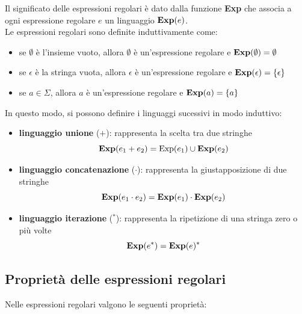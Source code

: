 \documentclass[12pt, a4paper, oneside]{book}
\begin{document}
  Il significato delle espressioni regolari è dato dalla funzione \textbf{Exp} che associa a ogni espressione regolare $e$ un linguaggio $\text{\textbf{Exp}}(e)$. \\[0.2ex]
  Le espressioni regolari sono definite induttivamente come:
  \begin{itemize}
    \item se $\emptyset$ è l'insieme vuoto, allora $\emptyset$ è un'espressione regolare e $\text{\textbf{Exp}}(\emptyset) = \emptyset$
    \item se $\epsilon$ è la stringa vuota, allora $\epsilon$ è un'espressione regolare e $\text{\textbf{Exp}}(\epsilon) = \{\epsilon\}$
    \item se $a \in \Sigma$, allora $a$ è un'espressione regolare e $\text{\textbf{Exp}}(a) = \{a\}$
  \end{itemize}


  In questo modo, si possono definire i linguaggi sucessivi in modo induttivo:
  \begin{itemize}
    \item \textcolor{azzurrino}{\textbf{linguaggio unione}} ($+$): rappresenta la scelta tra due stringhe
    \begin{equation*}
      \text{\textbf{Exp}}(e_1+e_2) = \text{Exp}(e_1) \cup \textbf{Exp}(e_2)
    \end{equation*}
    \item \textcolor{azzurrino}{\textbf{linguaggio concatenazione}} ($\cdot$): rappresenta la giustapposizione di due stringhe
    \begin{equation*}
      \text{\textbf{Exp}}(e_1 \cdot e_2) = \text{\textbf{Exp}}(e_1) \cdot \text{\textbf{Exp}}(e_2)
    \end{equation*}
    \item \textcolor{azzurrino}{\textbf{linguaggio iterazione}} ($^*$): rappresenta la ripetizione di una stringa zero o più volte
    \begin{equation*}
      \text{\textbf{Exp}}(e^*) = \text{\textbf{Exp}}(e)^*
    \end{equation*}
  \end{itemize}

  \subsection{Proprietà delle espressioni regolari}
  Nelle espressioni regolari valgono le seguenti proprietà:
  
\end{document}

